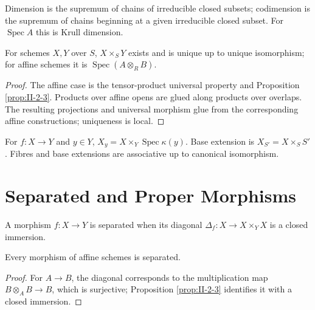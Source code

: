 \begin{definition}
\label{def:II-3-dimension}
Dimension is the supremum of chains of irreducible closed subsets; codimension is the supremum of
chains beginning at a given irreducible closed subset. For $\operatorname{Spec}A$ this is Krull dimension.
\end{definition}

\begin{theorem}
\label{thm:II-3-3}
For schemes $X,Y$ over $S$, $X\times_S Y$ exists and is unique up to unique isomorphism; for affine
schemes it is $\operatorname{Spec}(A\otimes_RB)$.
\end{theorem}
\begin{proof}
The affine case is the tensor-product universal property and Proposition \ref{prop:II-2-3}.
Products over affine opens are glued along products over overlaps. The resulting projections and
universal morphism glue from the corresponding affine constructions; uniqueness is local.
\end{proof}

\begin{definition}
\label{def:II-3-fibre}
For $f:X\to Y$ and $y\in Y$, $X_y=X\times_Y\operatorname{Spec}\kappa(y)$. Base extension is
$X_{S'}=X\times_SS'$. Fibres and base extensions are associative up to canonical isomorphism.
\end{definition}

\section{Separated and Proper Morphisms}

\begin{definition}
\label{def:II-4-separated}
A morphism $f:X\to Y$ is separated when its diagonal $\Delta_f:X\to X\times_YX$ is a closed immersion.
\end{definition}

\begin{proposition}
\label{prop:II-4-1}
Every morphism of affine schemes is separated.
\end{proposition}
\begin{proof}
For $A\to B$, the diagonal corresponds to the multiplication map $B\otimes_AB\to B$, which is surjective;
Proposition \ref{prop:II-2-3} identifies it with a closed immersion.
\end{proof}

